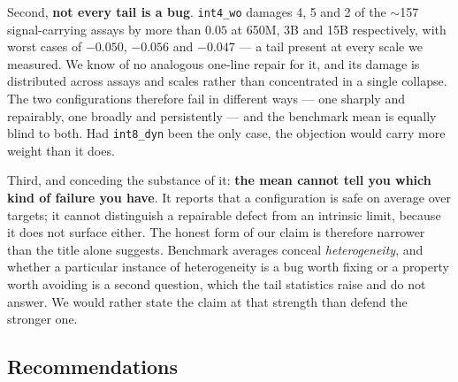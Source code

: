 \documentclass[11pt]{article}
\newcommand{\cfg}[1]{\texttt{#1}}
\begin{document}
Second, \textbf{not every tail is a bug}. \cfg{int4\_wo} damages 4, 5 and 2 of
the $\sim$157 signal-carrying assays by more than $0.05$ at 650M, 3B and 15B
respectively, with worst cases of $-0.050$, $-0.056$ and $-0.047$ --- a tail
present at every scale we measured. We know of no analogous one-line repair for it, and its damage is
distributed across assays and scales rather than concentrated in a single
collapse. The two configurations therefore fail in different ways --- one
sharply and repairably, one broadly and persistently --- and the benchmark mean
is equally blind to both. Had \cfg{int8\_dyn} been the only case, the objection
would carry more weight than it does.

Third, and conceding the substance of it: \textbf{the mean cannot tell you which
kind of failure you have}. It reports that a configuration is safe on average
over targets; it cannot distinguish a repairable defect from an intrinsic limit,
because it does not surface either. The honest form of our claim is therefore
narrower than the title alone suggests. Benchmark averages conceal
\emph{heterogeneity}, and whether a particular instance of heterogeneity is a
bug worth fixing or a property worth avoiding is a second question, which the
tail statistics raise and do not answer. We would rather state the claim at that
strength than defend the stronger one.

\subsection{Recommendations}
\end{document}
